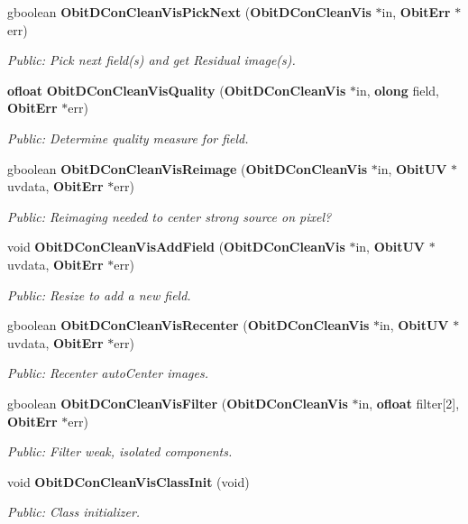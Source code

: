 \begin{CompactItemize}
gboolean {\bf Obit\-DCon\-Clean\-Vis\-Pick\-Next} ({\bf Obit\-DCon\-Clean\-Vis} $\ast$in, {\bf Obit\-Err} $\ast$err)
\begin{CompactList}\small\item\em Public: Pick next field(s) and get Residual image(s). \item\end{CompactList}\item 
{\bf ofloat} {\bf Obit\-DCon\-Clean\-Vis\-Quality} ({\bf Obit\-DCon\-Clean\-Vis} $\ast$in, {\bf olong} field, {\bf Obit\-Err} $\ast$err)
\begin{CompactList}\small\item\em Public: Determine quality measure for field. \item\end{CompactList}\item 
gboolean {\bf Obit\-DCon\-Clean\-Vis\-Reimage} ({\bf Obit\-DCon\-Clean\-Vis} $\ast$in, {\bf Obit\-UV} $\ast$uvdata, {\bf Obit\-Err} $\ast$err)
\begin{CompactList}\small\item\em Public: Reimaging needed to center strong source on pixel? \item\end{CompactList}\item 
void {\bf Obit\-DCon\-Clean\-Vis\-Add\-Field} ({\bf Obit\-DCon\-Clean\-Vis} $\ast$in, {\bf Obit\-UV} $\ast$uvdata, {\bf Obit\-Err} $\ast$err)
\begin{CompactList}\small\item\em Public: Resize to add a new field. \item\end{CompactList}\item 
gboolean {\bf Obit\-DCon\-Clean\-Vis\-Recenter} ({\bf Obit\-DCon\-Clean\-Vis} $\ast$in, {\bf Obit\-UV} $\ast$uvdata, {\bf Obit\-Err} $\ast$err)
\begin{CompactList}\small\item\em Public: Recenter auto\-Center images. \item\end{CompactList}\item 
gboolean {\bf Obit\-DCon\-Clean\-Vis\-Filter} ({\bf Obit\-DCon\-Clean\-Vis} $\ast$in, {\bf ofloat} filter[2], {\bf Obit\-Err} $\ast$err)
\begin{CompactList}\small\item\em Public: Filter weak, isolated components. \item\end{CompactList}\item 
void {\bf Obit\-DCon\-Clean\-Vis\-Class\-Init} (void)
\begin{CompactList}\small\item\em Public: Class initializer. \item\end{CompactList}\end{CompactItemize}


